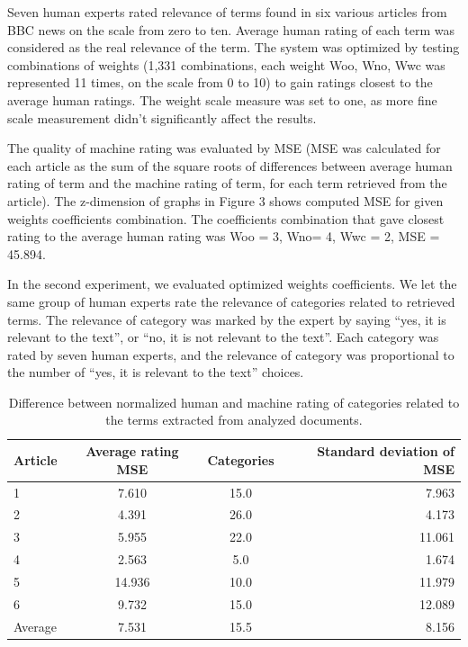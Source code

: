\documentclass{llncs}%
\begin{document}
Seven human experts rated relevance of terms found in six various articles from BBC news on the scale from zero to ten. Average human rating of each term was considered as the real relevance of the term. The system was optimized by testing combinations of weights (1,331 combinations, each weight Woo, Wno, Wwc was represented 11 times, on the scale from 0 to 10) to gain ratings closest to the average human ratings. The weight scale measure was set to one, as more fine scale measurement didn’t significantly affect the results. 
 
The quality of machine rating was evaluated by MSE (MSE was calculated for each article as the sum of the square roots of differences between average human rating of term and the machine rating of term, for each term retrieved from the article). The z-dimension of graphs in Figure 3 shows computed MSE for given weights coefficients combination. The coefficients combination that gave closest rating to the average human rating was Woo = 3, Wno= 4, Wwc = 2, MSE = 45.894. 

In the second experiment, we evaluated optimized weights coefficients. We let the same group of human experts rate the relevance of categories related to retrieved terms. The relevance of category was marked by the expert by saying “yes, it is relevant to the text”, or “no, it is not relevant to the text”. Each category was rated by seven human experts, and the relevance of category was proportional to the number of “yes, it is relevant to the text” choices. 

\begin{table}[ht]%
\centering
\caption{Difference between normalized human and machine rating of categories related to the terms extracted from analyzed documents. }
\label{tab1}
\begin{tabular}{|l|c|c|r|}%
\hline%
Article & Average rating MSE & Categories & Standard deviation of MSE \\
\hline
1 & 7.610 & 15.0 & 7.963 \\
2 & 4.391 & 26.0 & 4.173\\
3 & 5.955 & 22.0 & 11.061 \\
4 & 2.563 & 5.0 & 1.674 \\
5 & 14.936 & 10.0 & 11.979 \\
6 & 9.732 &  15.0 & 12.089\\
Average & 7.531 & 15.5 & 8.156 \\
\hline
\end{tabular}
\end{table}
\end{document}
